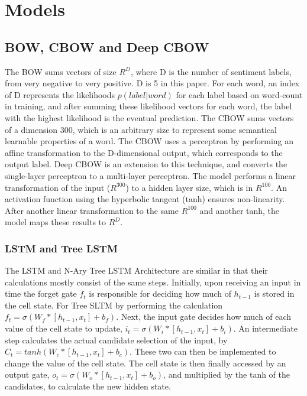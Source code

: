 \section{Models}
\label{sec: models}
\subsection{BOW, CBOW and Deep CBOW}
The BOW sums vectors of size $R^{D}$, where D is the number of sentiment labels,
from very negative to very positive. D is 5 in this paper. For each word, an
index of D represents the likelihoods $p(label|word)$ for each label based on
word-count in training, and after summing these likelihood vectors for each
word, the label with the highest likelihood is the eventual prediction. The CBOW
sums vectors of a dimension 300, which is an arbitrary size to represent some
semantical learnable properties of a word. The CBOW uses a perceptron by
performing an affine transformation to the D-dimensional output, which
corresponds to the output label. Deep CBOW is an extension to this technique,
and converts the single-layer perceptron to a multi-layer perceptron. The model
performs a linear transformation of the input ($R^{300}$) to a hidden layer
size, which is in $R^{100}$. An activation function using the hyperbolic tangent
(tanh) ensures non-linearity. After another linear transformation to the same
$R^{100}$ and another tanh, the model maps these results to $R^D$.
\subsubsection{LSTM and Tree LSTM}
The LSTM and N-Ary Tree LSTM Architecture are similar in that their calculations
mostly consist of the same steps. Initially, upon receiving an input in time the
forget gate $f_t$ is responsible for deciding how much of $h_{t-1}$ is stored in
the cell state. For Tree SLTM by performing the calculation $f_t = \sigma(W_f * [h_{t-1}, x_t]
+ b_f)$. Next, the input gate decides how much of each value of the cell state
to update, $i_t = \sigma(W_i * [h_{t-1}, x_t] + b_i)$. An intermediate step
calculates the actual candidate selection of the input, by $C_t = tanh(W_c *
[h_{t-1}, x_t] + b_c)$. These two can then be implemented to change the value of
the cell state. The cell state is then finally accessed by an output gate, $o_t
= \sigma(W_o * [h_{t-1}, x_t] + b_o)$, and multiplied by the tanh of the
candidates, to calculate the new hidden state.















